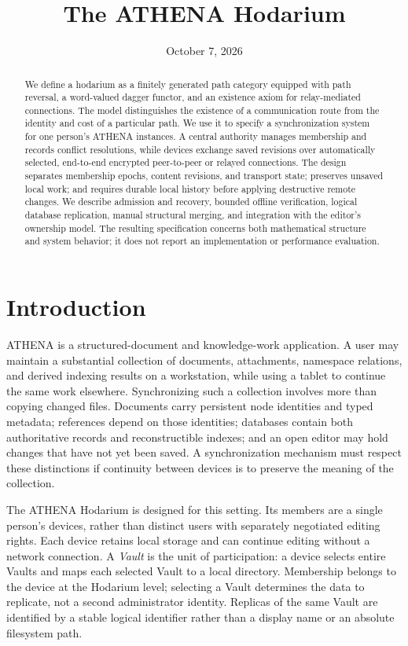 \documentclass[11pt,a4paper]{article}
\title{\normalfont\LARGE The ATHENA Hodarium}
\author{}
\date{October 7, 2026}
\theoremstyle{definition}
\theoremstyle{plain}
\begin{document}
\maketitle

\begin{abstract}
We define a hodarium as a finitely generated path category equipped with
path reversal, a word-valued dagger functor, and an existence axiom for
relay-mediated connections. The model distinguishes the existence of a
communication route from the identity and cost of a particular path.
We use it to specify a synchronization system for one person's ATHENA
instances. A central authority manages membership and records conflict
resolutions, while devices exchange saved revisions over automatically
selected, end-to-end encrypted peer-to-peer or relayed connections.
The design separates membership epochs, content revisions, and transport
state; preserves unsaved local work; and requires durable local history
before applying destructive remote changes. We describe admission and
recovery, bounded offline verification, logical database replication,
manual structural merging, and integration with the editor's ownership
model. The resulting specification concerns both mathematical structure
and system behavior; it does not report an implementation or performance
evaluation.
\end{abstract}

\section{Introduction}
\label{sec:introduction}

ATHENA is a structured-document and knowledge-work application. A user
may maintain a substantial collection of documents, attachments,
namespace relations, and derived indexing results on a workstation,
while using a tablet to continue the same work elsewhere. Synchronizing
such a collection involves more than copying changed files. Documents
carry persistent node identities and typed metadata; references depend
on those identities; databases contain both authoritative records and
reconstructible indexes; and an open editor may hold changes that have
not yet been saved. A synchronization mechanism must respect these
distinctions if continuity between devices is to preserve the meaning
of the collection.

The ATHENA Hodarium is designed for this setting. Its members are a
single person's devices, rather than distinct users with separately
negotiated editing rights. Each device retains local storage and can
continue editing without a network connection. A \emph{Vault} is the unit
of participation: a device selects entire Vaults and maps each selected
Vault to a local directory. Membership belongs to the device at the
Hodarium level; selecting a Vault determines the data to replicate, not
a second administrator identity. Replicas of the same Vault are
identified by a stable logical identifier rather than a display name
or an absolute filesystem path.
\end{document}
